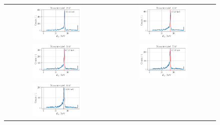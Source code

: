 \documentclass[ngerman]{scrartcl}
\begin{document}
\begin{figure}[H]
    \centering
    \begin{tabular}{cc}
      \includegraphics[width=0.48\textwidth]{../plots/energie_spektren_1.pdf} &
      \includegraphics[width=0.48\textwidth]{../plots/energie_spektren_2.pdf} \\
      \includegraphics[width=0.48\textwidth]{../plots/energie_spektren_3.pdf} &
      \includegraphics[width=0.48\textwidth]{../plots/energie_spektren_4.pdf} \\
      \includegraphics[width=0.48\textwidth]{../plots/energie_spektren_5.pdf} &

\end{tabular}
\end{figure}
\end{document}
